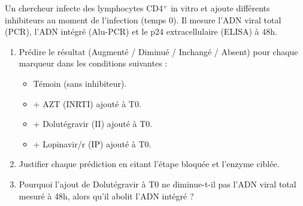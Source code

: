 \documentclass[11pt]{article}
\begin{document}
\begin{exercice}
Un chercheur infecte des lymphocytes CD4$^+$ in vitro et ajoute différents inhibiteurs au moment de l'infection (temps 0). Il mesure l'ADN viral total (PCR), l'ADN intégré (Alu-PCR) et le p24 extracellulaire (ELISA) à 48h.
\begin{enumerate}
    \item Prédire le résultat (Augmenté / Diminué / Inchangé / Absent) pour chaque marqueur dans les conditions suivantes :
    \begin{itemize}
        \item Témoin (sans inhibiteur).
        \item + AZT (INRTI) ajouté à T0.
        \item + Dolutégravir (II) ajouté à T0.
        \item + Lopinavir/r (IP) ajouté à T0.
    \end{itemize}
    \item Justifier chaque prédiction en citant l'étape bloquée et l'enzyme ciblée.
    \item Pourquoi l'ajout de Dolutégravir à T0 ne diminue-t-il pas l'ADN viral total mesuré à 48h, alors qu'il abolit l'ADN intégré ?
\end{enumerate}
\end{exercice}
\end{document}
